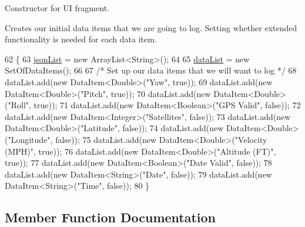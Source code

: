 Constructor for UI fragment. 

Creates our initial data items that we are going to log. Setting whether extended functionality is needed for each data item. 
\begin{DoxyCode}
62                               \{
63         \hyperlink{classcom_1_1jack_1_1motorbikestatistics_1_1_realtime_fragment_aeaf4c36f29c56ec961bda017de9cc671}{jsonList} = \textcolor{keyword}{new} ArrayList<String>();
64 
65         \hyperlink{classcom_1_1jack_1_1motorbikestatistics_1_1_realtime_fragment_adde56e8b4f0e954a9a1167e50fb80420}{dataList} = \textcolor{keyword}{new} SetOfDataItems();
66 
67         \textcolor{comment}{/* Set up our data items that we will want to log */}
68         dataList.add(\textcolor{keyword}{new} DataItem<Double>(\textcolor{stringliteral}{"Yaw"}, \textcolor{keyword}{true}));
69         dataList.add(\textcolor{keyword}{new} DataItem<Double>(\textcolor{stringliteral}{"Pitch"}, \textcolor{keyword}{true}));
70         dataList.add(\textcolor{keyword}{new} DataItem<Double>(\textcolor{stringliteral}{"Roll"}, \textcolor{keyword}{true}));
71         dataList.add(\textcolor{keyword}{new} DataItem<Boolean>(\textcolor{stringliteral}{"GPS Valid"}, \textcolor{keyword}{false}));
72         dataList.add(\textcolor{keyword}{new} DataItem<Integer>(\textcolor{stringliteral}{"Satellites"}, \textcolor{keyword}{false}));
73         dataList.add(\textcolor{keyword}{new} DataItem<Double>(\textcolor{stringliteral}{"Latitude"}, \textcolor{keyword}{false}));
74         dataList.add(\textcolor{keyword}{new} DataItem<Double>(\textcolor{stringliteral}{"Longitude"}, \textcolor{keyword}{false}));
75         dataList.add(\textcolor{keyword}{new} DataItem<Double>(\textcolor{stringliteral}{"Velocity (MPH)"}, \textcolor{keyword}{true}));
76         dataList.add(\textcolor{keyword}{new} DataItem<Double>(\textcolor{stringliteral}{"Altitude (FT)"}, \textcolor{keyword}{true}));
77         dataList.add(\textcolor{keyword}{new} DataItem<Boolean>(\textcolor{stringliteral}{"Date Valid"}, \textcolor{keyword}{false}));
78         dataList.add(\textcolor{keyword}{new} DataItem<String>(\textcolor{stringliteral}{"Date"}, \textcolor{keyword}{false}));
79         dataList.add(\textcolor{keyword}{new} DataItem<String>(\textcolor{stringliteral}{"Time"}, \textcolor{keyword}{false}));
80     \}
\end{DoxyCode}


\subsection{Member Function Documentation}
\mbox{\label{classcom_1_1jack_1_1motorbikestatistics_1_1_realtime_fragment_a68850ca4bf4eabcdf4ed4005d5f0d4d7}} 
